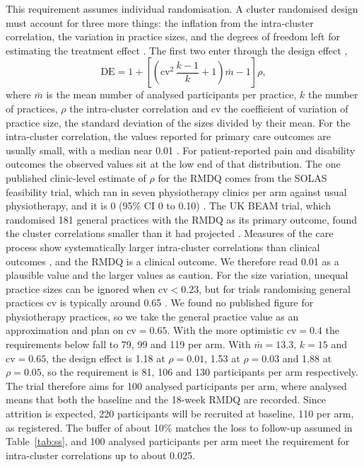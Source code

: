 \documentclass[11pt,a4paper]{article}
\begin{document}
This requirement assumes individual randomisation. A cluster randomised design
must account for three more things: the inflation from the intra-cluster
correlation, the variation in practice sizes, and the degrees of freedom left
for estimating the treatment effect \citep{vanbreukelen2018}. The first two
enter through the design effect \citep{eldridge2006},
\begin{equation}
\label{eq:de}
\mathrm{DE} = 1 + \left[ \left( \mathrm{cv}^2\,\frac{k-1}{k} + 1 \right) \bar m - 1 \right]\rho ,
\end{equation}
where $\bar m$ is the mean number of analysed participants per practice, $k$ the
number of practices, $\rho$ the intra-cluster correlation and $\mathrm{cv}$ the
coefficient of variation of practice size, the standard deviation of the
sizes divided by their mean. For the intra-cluster correlation, the values reported for primary care
outcomes are usually small, with a median near 0.01 \citep{adams2004}. For patient-reported pain and disability outcomes the
observed values sit at the low end of that distribution. The one published
clinic-level estimate of $\rho$ for the RMDQ comes from the SOLAS
feasibility trial, which ran in seven physiotherapy clinics per arm against
usual physiotherapy, and it is 0 (95\% CI 0 to 0.10)
\citep{hurley2020, king2023}. The UK BEAM trial, which randomised 181
general practices with the RMDQ as its primary outcome, found the cluster
correlations smaller than it had projected \citep{ukbeam2004}. Measures of
the care process show systematically larger intra-cluster correlations than
clinical outcomes \citep{campbell2005}, and the RMDQ is a clinical outcome.
We therefore read 0.01 as a plausible value and the larger values as
caution. For the size variation, unequal practice sizes can be ignored when
$\mathrm{cv} < 0.23$, but for trials randomising general practices $\mathrm{cv}$ is typically around
0.65 \citep{eldridge2006}. We found no published figure for physiotherapy practices, so we take the general practice value as an approximation and plan on $\mathrm{cv} = 0.65$. With the more optimistic $\mathrm{cv} = 0.4$ the requirements below fall to 79, 99 and 119 per arm. With $\bar m = 13.3$, $k = 15$ and $\mathrm{cv} = 0.65$, the design effect is 1.18 at $\rho = 0.01$, 1.53 at $\rho = 0.03$ and 1.88 at $\rho = 0.05$, so the requirement is 81, 106 and 130 participants per arm respectively. The trial
therefore aims for 100 analysed participants per arm, where analysed means
that both the baseline and the 18-week RMDQ are recorded. Since attrition is
expected, 220 participants will be recruited at baseline, 110 per arm, as
registered. The buffer of about 10\% matches the loss to follow-up assumed in
Table~\ref{tab:ss}, and 100 analysed participants per arm meet the
requirement for intra-cluster correlations up to about 0.025.
\end{document}
